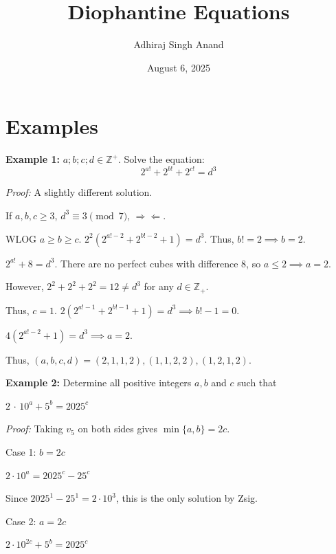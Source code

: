 \documentclass[10pt,letterpaper]{article}
\title{Diophantine Equations}
\author{Adhiraj Singh Anand}
\date{August 6, 2025}
\begin{document}
\maketitle\section{Examples}
\begin{tcolorbox}[breakable,title={Azerbaijan Senior NMO 2020},colbacktitle=black!4,coltitle=black,fonttitle=\normalfont]
\textbf{Example 1:} $a;b;c;d\in\mathbb{Z^+}$. Solve the equation: $$2^{a!}+2^{b!}+2^{c!}=d^3$$
\end{tcolorbox}
\textit{Proof:}
A slightly different solution.

If $a, b, c\ge 3$, $d^3\equiv 3\pmod 7$, $\Rightarrow \Leftarrow$.

WLOG $a\ge b\ge c$. $2^2(2^{a!-2}+2^{b!-2}+1)=d^3$. Thus, $b!=2\implies b=2$.

$2^{a!}+8=d^3$. There are no perfect cubes with difference $8$, so $a\le 2\implies a=2$.

However, $2^2+2^2+2^2=12\neq d^3$ for any $d\in \mathbb{Z_{+}}$.

Thus, $c=1$. $2(2^{a!-1}+2^{b!-1}+1)=d^3\implies b!-1=0$.

$4(2^{a!-2}+1)=d^3\implies a=2$.

Thus, $(a,b,c,d)=(2,1,1,2), (1,1,2,2), (1,2,1,2)$.
\nopagebreak[4]\par{}
\par\vspace{12pt}
\begin{tcolorbox}[breakable,title={Serbia JBMO TST 2025 P3},colbacktitle=black!4,coltitle=black,fonttitle=\normalfont]
\textbf{Example 2:} Determine all positive integers $a, b$ and $c$ such that

$2$ $\cdot$ $10^a + 5^b = 2025^c$
\end{tcolorbox}
\textit{Proof:}
Taking $v_5$ on both sides gives $\min\{a,b\}=2c$.

Case 1: $b=2c$

$2\cdot 10^a=2025^c-25^c$

Since $2025^1-25^1=2\cdot 10^3$, this is the only solution by Zsig.

Case 2: $a=2c$

$2\cdot 10^{2c}+5^b=2025^c$
\end{document}
